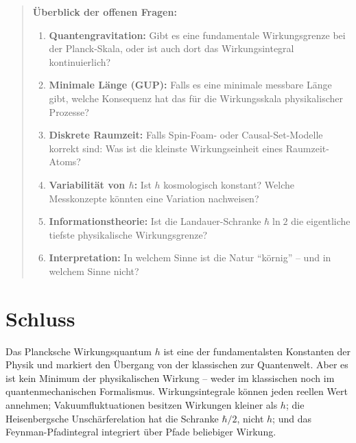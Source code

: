 ﻿\documentclass[12pt,a4paper]{article}
\theoremstyle{plain}
\theoremstyle{definition}
\theoremstyle{remark}
\begin{document}
\begin{quote}
\textbf{Überblick der offenen Fragen:}
\begin{enumerate}[leftmargin=1.5em,label=\arabic*.]
  \item \textbf{Quantengravitation:} Gibt es eine fundamentale Wirkungsgrenze bei der
    Planck-Skala, oder ist auch dort das Wirkungsintegral kontinuierlich?
  \item \textbf{Minimale Länge (GUP):} Falls es eine minimale messbare Länge gibt,
    welche Konsequenz hat das für die Wirkungsskala physikalischer Prozesse?
  \item \textbf{Diskrete Raumzeit:} Falls Spin-Foam- oder Causal-Set-Modelle korrekt
    sind: Was ist die kleinste Wirkungseinheit eines Raumzeit-Atoms?
  \item \textbf{Variabilität von $\hbar$:} Ist $h$ kosmologisch konstant? Welche
    Messkonzepte könnten eine Variation nachweisen?
  \item \textbf{Informationstheorie:} Ist die Landauer-Schranke $\hbar\ln 2$ die
    eigentliche tiefste physikalische Wirkungsgrenze?
  \item \textbf{Interpretation:} In welchem Sinne ist die Natur ``körnig'' -- und in
    welchem Sinne nicht?
\end{enumerate}
\end{quote}

\section{Schluss}

Das Plancksche Wirkungsquantum $h$ ist eine der fundamentalsten Konstanten der Physik
und markiert den Übergang von der klassischen zur Quantenwelt. Aber es ist kein
Minimum der physikalischen Wirkung -- weder im klassischen noch im quantenmechanischen
Formalismus. Wirkungsintegrale können jeden reellen Wert annehmen; Vakuumfluktuationen
besitzen Wirkungen kleiner als $h$; die Heisenbergsche Unschärferelation hat die Schranke
$\hbar/2$, nicht $h$; und das Feynman-Pfadintegral integriert über Pfade beliebiger
Wirkung.
\end{document}
